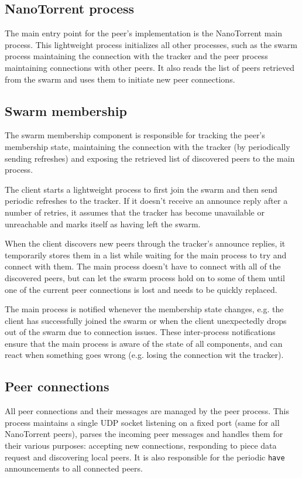 \subsection{NanoTorrent process}
The main entry point for the peer's implementation is the NanoTorrent main process. This lightweight process initializes all other processes, such as the swarm process maintaining the connection with the tracker and the peer process maintaining connections with other peers. It also reads the list of peers retrieved from the swarm and uses them to initiate new peer connections.

\subsection{Swarm membership}
The swarm membership component is responsible for tracking the peer's membership state, maintaining the connection with the tracker (by periodically sending refreshes) and exposing the retrieved list of discovered peers to the main process.

The client starts a lightweight process to first join the swarm and then send periodic refreshes to the tracker. If it doesn't receive an announce reply after a number of retries, it assumes that the tracker has become unavailable or unreachable and marks itself as having left the swarm.

When the client discovers new peers through the tracker's announce replies, it temporarily stores them in a list while waiting for the main process to try and connect with them. The main process doesn't have to connect with all of the discovered peers, but can let the swarm process hold on to some of them until one of the current peer connections is lost and needs to be quickly replaced.

The main process is notified whenever the membership state changes, e.g. the client has successfully joined the swarm or when the client unexpectedly drops out of the swarm due to connection issues. These inter-process notifications ensure that the main process is aware of the state of all components, and can react when something goes wrong (e.g. losing the connection wit the tracker).

\subsection{Peer connections}
All peer connections and their messages are managed by the peer process. This process maintains a single \gls{UDP} socket listening on a fixed port (same for all NanoTorrent peers), parses the incoming peer messages and handles them for their various purposes: accepting new connections, responding to piece data request and discovering local peers. It is also responsible for the periodic \texttt{have} announcements to all connected peers.

